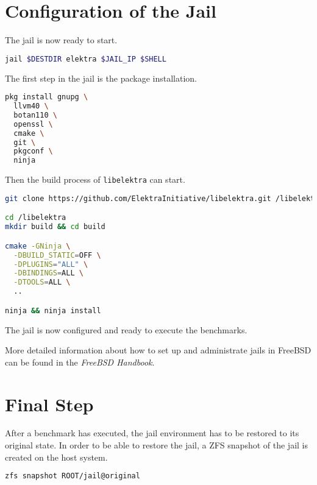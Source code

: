 \section*{Configuration of the Jail}

The jail is now ready to start.

\begin{lstlisting}[language=bash]
jail $DESTDIR elektra $JAIL_IP $SHELL
\end{lstlisting}

The first step in the jail is the package installation.

\begin{lstlisting}[language=bash]
pkg install gnupg \
  llvm40 \
  botan110 \
  openssl \
  cmake \
  git \
  pkgconf \
  ninja
\end{lstlisting}

Then the build process of \texttt{libelektra} can start.

\begin{lstlisting}[language=bash]
git clone https://github.com/ElektraInitiative/libelektra.git /libelektra

cd /libelektra
mkdir build && cd build

cmake -GNinja \
  -DBUILD_STATIC=OFF \
  -DPLUGINS="ALL" \
  -DBINDINGS=ALL \
  -DTOOLS=ALL \
  ..

ninja && ninja install
\end{lstlisting}

The jail is now configured and ready to execute the benchmarks.

More detailed information about how to set up and administrate jails in FreeBSD can be found in the \emph{FreeBSD Handbook}.\cite{freebsd-doc}

\section*{Final Step}

After a benchmark has executed, the jail environment has to be restored to its original state.
In order to be able to restore the jail, a ZFS snapshot of the jail is created on the host system.

\begin{lstlisting}[language=bash]
zfs snapshot ROOT/jail@original
\end{lstlisting}
